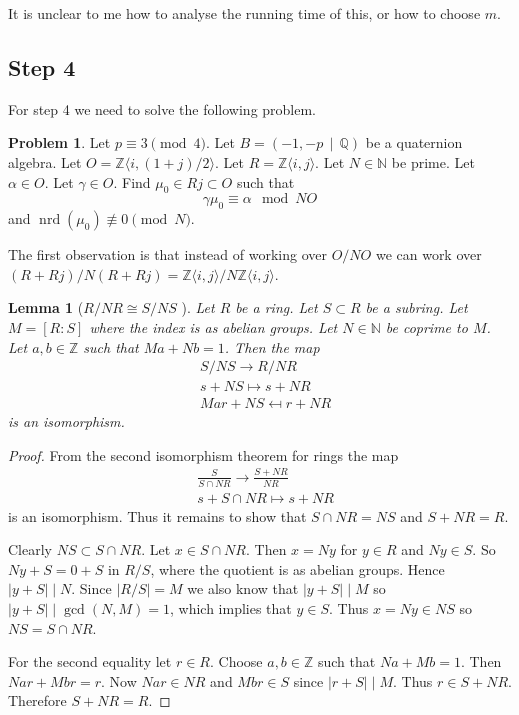 \documentclass[10pt]{article}
\theoremstyle{plain}
\newtheorem{lemma}[theorem]{Lemma}
\theoremstyle{definition}
\newtheorem{prob}[theorem]{Problem}
\newcommand{\iso}{\cong}
\newcommand{\op}{\operatorname}
\newcommand{\N}{\mathbb{N}}
\newcommand{\Z}{\mathbb{Z}}
\newcommand{\Q}{\mathbb{Q}}
\newcommand{\nrd}{\op{nrd}}
\begin{document}
{\color{red} It is unclear to me how to analyse the running time of this, or how to choose \( m \).}

\subsection{Step 4}
For step 4 we need to solve the following problem.

\begin{prob} \label{prob: gamma*mu_0 = alpha}
    Let \( p \equiv 3 \pmod{4} \).
    Let \( B =  (-1, -p \, \mid \, \Q) \) be a quaternion algebra.
    Let \( O = \Z \langle i, (1+j) / 2 \rangle \).
    Let \( R = \Z \langle i , j \rangle \).
    Let \( N \in \N \) be prime.
    Let \( \alpha \in O \).
    Let \( \gamma \in O \).
    Find \( \mu_0 \in Rj \subset  O \) such that
    \[
        \gamma\mu_0 \equiv \alpha \mod NO
    \]
    and \( \nrd(\mu_0) \not\equiv 0 \pmod{N} \).
\end{prob}

The first observation is that instead of working over \( O / NO \) we can work over \( (R+Rj) / N(R+Rj) = \Z \langle i, j \rangle / N \Z \langle i, j \rangle\).

\begin{lemma}[\( R/ NR \iso S / NS \) ]
    Let \( R \) be a ring.
    Let \( S \subset R \) be a subring.
    Let \( M = [R : S] \) where the index is as abelian groups.
    Let \( N \in \N \) be coprime to \( M \).
    Let \( a, b \in \Z \) such that \( Ma + Nb = 1 \).
    Then the map
    \begin{align*}
          & S / NS \to R / NR         \\
          & s + NS \mapsto s + NR     \\
          & Mar + NS \mapsfrom r + NR
    \end{align*}
    is an isomorphism.
\end{lemma}
\begin{proof}
    From the second isomorphism theorem for rings the map
    \begin{align*}
          & \frac{S}{S \cap NR} \to \frac{S + NR}{NR} \\
          & s + S \cap NR \mapsto s + NR
    \end{align*}
    is an isomorphism.
    Thus it remains to show that \( S \cap NR = NS \) and \( S + NR = R \).

    Clearly \( NS \subset S \cap NR \).
    Let \( x \in S \cap NR \).
    Then \( x = Ny \) for \( y \in R \) and \( Ny \in S \).
    So \( Ny + S = 0 + S \) in \( R / S \), where the quotient is as abelian groups.
    Hence \( |y + S| \mid N \).
    Since \( |R / S| = M \) we also know that \( |y + S| \mid M \) so \( |y + S| \mid \gcd(N, M) = 1 \), which implies that \( y \in S \).
    Thus \( x = Ny \in NS \) so \( NS = S \cap NR \).

    For the second equality let \( r \in R \).
    Choose \( a, b \in \Z \) such that \( Na + Mb = 1 \).
    Then \( Nar + Mbr = r \).
    Now \( Nar \in NR \) and \( Mbr \in S \) since \( |r + S| \mid M \).
    Thus \( r \in S + NR \).
    Therefore \( S + NR = R \).
\end{proof}
\end{document}
